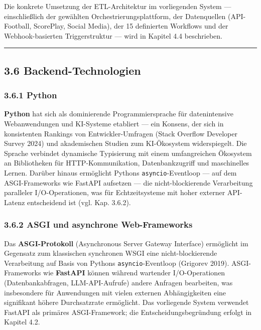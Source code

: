 Die konkrete Umsetzung der ETL-Architektur im vorliegenden System ---
einschließlich der gewählten Orchestrierungsplattform, der Datenquellen
(API-Football, ScorePlay, Social Media), der 15 definierten Workflows
und der Webhook-basierten Triggerstruktur --- wird in Kapitel 4.4
beschrieben.

\begin{center}\rule{0.5\linewidth}{0.5pt}\end{center}

\subsection{3.6 Backend-Technologien}\label{backend-technologien}

\subsubsection{3.6.1 Python}\label{python}

\textbf{Python} hat sich als dominierende Programmiersprache für
datenintensive Webanwendungen und KI-Systeme etabliert --- ein Konsens,
der sich in konsistenten Rankings von Entwickler-Umfragen (Stack
Overflow Developer Survey 2024) und akademischen Studien zum
KI-Ökosystem widerspiegelt. Die Sprache verbindet dynamische Typisierung
mit einem umfangreichen Ökosystem an Bibliotheken für
HTTP-Kommunikation, Datenbankzugriff und maschinelles Lernen. Darüber
hinaus ermöglicht Pythons \passthrough{\lstinline!asyncio!}-Eventloop
--- auf dem ASGI-Frameworks wie FastAPI aufsetzen --- die
nicht-blockierende Verarbeitung paralleler I/O-Operationen, was für
Echtzeitsysteme mit hoher externer API-Latenz entscheidend ist (vgl.
Kap. 3.6.2).

\subsubsection{3.6.2 ASGI und asynchrone
Web-Frameworks}\label{asgi-und-asynchrone-web-frameworks}

Das \textbf{ASGI-Protokoll} (Asynchronous Server Gateway Interface)
ermöglicht im Gegensatz zum klassischen synchronen WSGI eine
nicht-blockierende Verarbeitung auf Basis von Pythons
\passthrough{\lstinline!asyncio!}-Eventloop (Grigorev 2019).
ASGI-Frameworks wie \textbf{FastAPI} können während wartender
I/O-Operationen (Datenbankabfragen, LLM-API-Aufrufe) andere Anfragen
bearbeiten, was insbesondere für Anwendungen mit vielen externen
Abhängigkeiten eine signifikant höhere Durchsatzrate ermöglicht. Das
vorliegende System verwendet FastAPI als primäres ASGI-Framework; die
Entscheidungsbegründung erfolgt in Kapitel 4.2.

